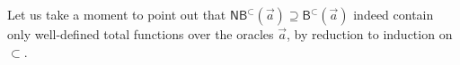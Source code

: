 \documentclass[manuscript,screen]{acmart}
\newcommand{\anupam}[1]{\todo{A: #1}}
\theoremstyle{definition}
\newtheorem{defn}[thm]{Definition}
\theoremstyle{remark}
\newcommand{\permpref}{\subset}
\newcommand{\saferec}{\mathsf{srec}}
\newcommand{\saferecwfpo}[1]{\saferec_{#1}}
\newcommand{\srecwfpo}[1]{\saferecwfpo{#1}}
\newcommand{\srecpp}{\srecwfpo{\permpref}}
\newcommand{\safenesrec}{\mathsf{snrec}}
\newcommand{\safenesrecwfpo}[1]{\safenesrec_{#1}}
\newcommand{\snrecwfpo}[1]{\safenesrecwfpo{#1}}
\newcommand{\snrecpp}{\snrecwfpo{\permpref}}
\newcommand{\bc}{\mathsf{B}}
\newcommand{\bcwfpo}[1]{\bc^{#1}}
\newcommand{\nested}{\mathsf{N}}
\newcommand{\nbc}{\nested\bc}
\newcommand{\nbcwfpo}[1]{\nested\bcwfpo{#1}}
\newcommand{\shallow}{\mathsf{S}}
\newcommand{\sbc}{\shallow\bc}
\newcommand{\sbcwfpo}[1]{\sbc^{#1}}
\newcommand{\bcpp}{\bcwfpo{\permpref}}
\newcommand{\nbcpp}{\nbcwfpo{\permpref}}
\newcommand{\sbcpp}{\sbcwfpo\permpref}
\newcommand{\cyclic}{\mathsf{C}}
\newcommand{\ncbc}{\cyclic\nested\bc}
\begin{document}
Let us take a moment to point out that $\nbcpp(\vec a)\supseteq  \bcpp(\vec a)$ indeed contain only well-defined total functions over the oracles $\vec a$, by reduction to induction on $\permpref$.



\end{document}
